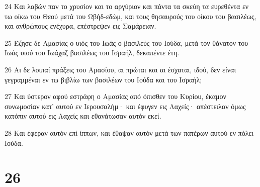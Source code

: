 \par 24 Και λαβών παν το χρυσίον και το αργύριον και πάντα τα σκεύη τα ευρεθέντα εν τω οίκω του Θεού μετά του Ωβήδ-εδώμ, και τους θησαυρούς του οίκου του βασιλέως, και ανθρώπους ενέχυρα, επέστρεψεν εις Σαμάρειαν.
\par 25 Έζησε δε Αμασίας ο υιός του Ιωάς ο βασιλεύς του Ιούδα, μετά τον θάνατον του Ιωάς υιού του Ιωάχαζ βασιλέως του Ισραήλ, δεκαπέντε έτη.
\par 26 Αι δε λοιπαί πράξεις του Αμασίου, αι πρώται και αι έσχαται, ιδού, δεν είναι γεγραμμέναι εν τω βιβλίω των βασιλέων του Ιούδα και του Ισραήλ;
\par 27 Και ύστερον αφού εστράφη ο Αμασίας από όπισθεν του Κυρίου, έκαμον συνωμοσίαν κατ' αυτού εν Ιερουσαλήμ· και έφυγεν εις Λαχείς· απέστειλαν όμως κατόπιν αυτού εις Λαχείς και εθανάτωσαν αυτόν εκεί.
\par 28 Και έφεραν αυτόν επί ίππων, και έθαψαν αυτόν μετά των πατέρων αυτού εν πόλει Ιούδα.

\chapter{26}

